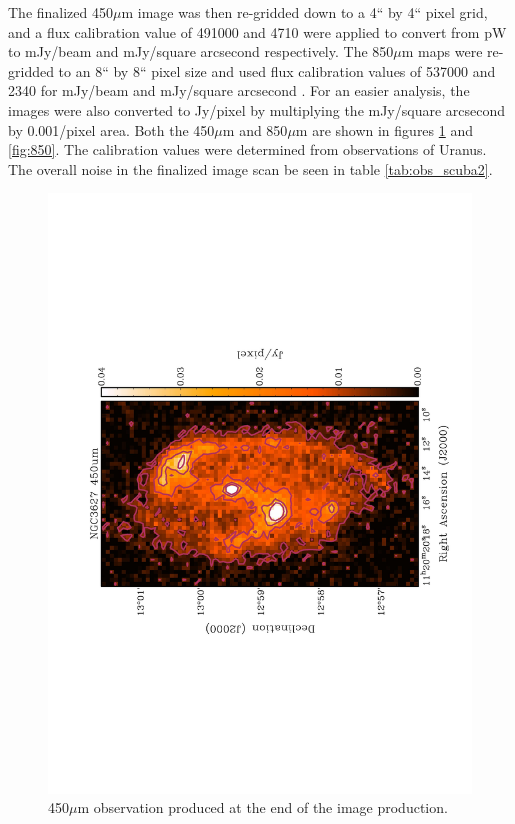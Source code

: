 The finalized 450$\mu$m image was then re-gridded down to a 4`` by 4`` pixel grid, and a flux calibration value of 491000 and 4710 were applied to convert from pW to mJy/beam and mJy/square arcsecond respectively.  The 850$\mu$m maps were re-gridded to an 8`` by 8`` pixel size and used flux calibration values of 537000 and 2340 for mJy/beam and mJy/square arcsecond .   For an easier analysis, the images were also converted to Jy/pixel by multiplying the mJy/square arcsecond by 0.001/pixel area.  Both the 450$\mu$m and 850$\mu$m are shown in figures \ref{fig:450} and \ref{fig:850}.  The calibration values were determined from observations of Uranus.   The overall noise in the finalized image scan be seen in table \ref{tab:obs_scuba2}.

\begin{figure}
  \centering
  \label{fig:450}
  \includegraphics[scale=0.5,angle=270]{obs_imgs/450_um.jpeg}
  \caption[NGC3627 450$\mu$m Observations]{450$\mu$m observation produced at the end of the image production.}
\end{figure}

